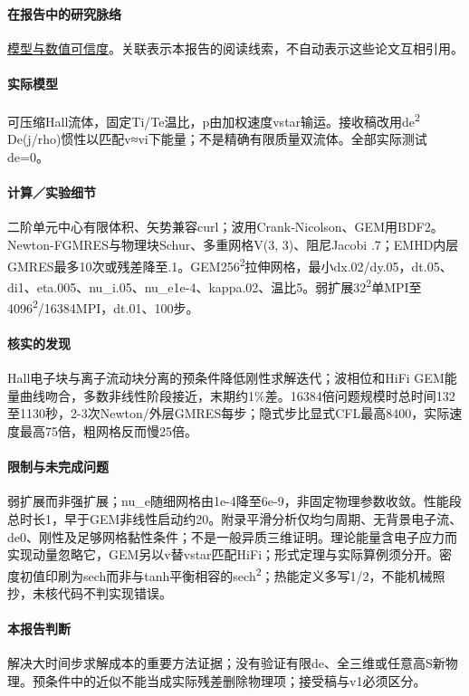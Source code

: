 \documentclass[UTF8,a4paper,11pt,openany,fontset=fandol]{ctexbook}
\begin{document}
\paragraph{在报告中的研究脉络}\hyperref[V1-ch:numerics]{模型与数值可信度}。关联表示本报告的阅读线索，不自动表示这些论文互相引用。

\paragraph{实际模型}可压缩Hall流体，固定Ti/Te温比，p由加权速度vstar输运。接收稿改用de\textsuperscript{2} De(j/rho)惯性以匹配v≈vi下能量；不是精确有限质量双流体。全部实际测试de=0。

\paragraph{计算／实验细节}二阶单元中心有限体积、矢势兼容curl；波用Crank-Nicolson、GEM用BDF2。Newton-FGMRES与物理块Schur、多重网格V(3, 3)、阻尼Jacobi .7；EMHD内层GMRES最多10次或残差降至.1。GEM256\textsuperscript{2}拉伸网格，最小dx.02/dy.05，dt.05、di1、eta.005、nu\_i.05、nu\_e1e-4、kappa.02、温比5。弱扩展32\textsuperscript{2}单MPI至4096\textsuperscript{2}/16384MPI，dt.01、100步。

\paragraph{核实的发现}Hall电子块与离子流动块分离的预条件降低刚性求解迭代；波相位和HiFi GEM能量曲线吻合，多数非线性阶段接近，末期约1\%差。16384倍问题规模时总时间132至1130秒，2-3次Newton/外层GMRES每步；隐式步比显式CFL最高8400，实际速度最高75倍，粗网格反而慢25倍。

\paragraph{限制与未完成问题}弱扩展而非强扩展；nu\_e随细网格由1e-4降至6e-9，非固定物理参数收敛。性能段总时长1，早于GEM非线性启动约20。附录平滑分析仅均匀周期、无背景电子流、de0、刚性及足够网格黏性条件；不是一般异质三维证明。理论能量含电子应力而实现动量忽略它，GEM另以v替vstar匹配HiFi；形式定理与实际算例须分开。密度初值印刷为sech而非与tanh平衡相容的sech\textsuperscript{2}；热能定义多写1/2，不能机械照抄，未核代码不判实现错误。

\paragraph{本报告判断}解决大时间步求解成本的重要方法证据；没有验证有限de、全三维或任意高S新物理。预条件中的近似不能当成实际残差删除物理项；接受稿与v1必须区分。
\end{document}
